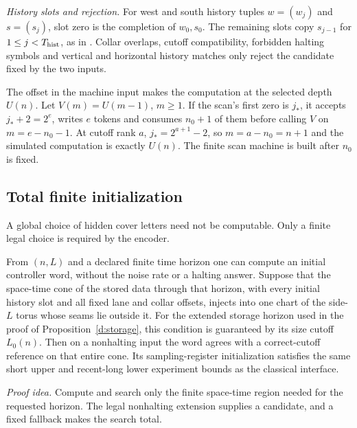 \emph{History slots and rejection.} For west and south history tuples \(w=(w_j)\) and \(s=(s_j)\), slot zero
is the completion of \(w_0,s_0\). The remaining slots copy \(s_{j-1}\)
for \(1\le j<T_{\rm hist}\), as in \cite[Section~11.4]{DMNoise2026}.
Collar overlaps, cutoff compatibility, forbidden halting symbols and
vertical and horizontal history matches only reject the candidate fixed
by the two inputs.

The offset in the machine input makes the computation at the selected depth \(U(n)\).
Let \(V(m)=U(m-1)\), \(m\ge1\). If the scan's first zero is
\(j_*\), it accepts \(j_*+2=2^e\), writes \(e\) tokens and
consumes \(n_0+1\) of them before calling \(V\) on
\(m=e-n_0-1\). At cutoff rank \(a\),
\(j_*=2^{a+1}-2\), so \(m=a-n_0=n+1\) and the simulated
computation is exactly \(U(n)\). The finite scan machine is built
after \(n_0\) is fixed.

\subsection{Total finite initialization}\label{subsec:c-initialization}
A global choice of hidden cover letters need not be computable. Only a finite legal
choice is required by the encoder.

\begin{lemma}\label{c:initialization}
From \((n,L)\) and a declared finite time horizon one can compute an initial
controller word, without the noise rate or a halting answer.
Suppose that the space-time cone of the stored data through that horizon,
with every initial history slot and all fixed lane and collar offsets,
injects into one chart of the side-\(L\) torus whose seams lie outside it.
For the extended storage horizon used in the proof of
Proposition~\ref{d:storage}, this condition is guaranteed by its size
cutoff \(L_0(n)\). Then on a nonhalting input the word agrees with a
correct-cutoff reference on that entire cone.
Its sampling-register initialization
satisfies the same short upper and recent-long lower experiment bounds as
the classical interface.
\end{lemma}
\par\noindent\emph{Proof idea.} Compute and search only the finite space-time region needed for the requested horizon. The legal nonhalting extension supplies a candidate, and a fixed fallback makes the search total.

